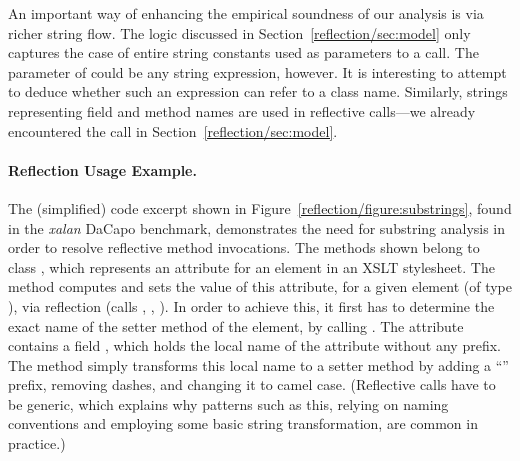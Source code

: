 An important way of enhancing the empirical soundness of our analysis
is via richer string flow. The logic discussed in
Section~\ref{reflection/sec:model} only captures the case of entire
string constants used as parameters to a  call. The
parameter of  could be any string expression,
however. It is interesting to attempt to deduce whether such an
expression can refer to a class name. Similarly, strings representing
field and method names are used in reflective calls---we already
encountered the  call in
Section~\ref{reflection/sec:model}.

\paragraph{Reflection Usage Example.}
The (simplified) code excerpt shown in Figure~\ref{reflection/figure:substrings},
found in the \emph{xalan} DaCapo benchmark, demonstrates the need for
substring analysis in order to resolve reflective method
invocations. The methods shown belong to class
,
which represents an attribute for an element in an XSLT
stylesheet. The method  computes and sets the value
of this attribute, for a given element (of type
), via reflection (calls ,
, ). In order to achieve this, it first has
to determine the exact name of the setter method of the element, by
calling . The attribute contains a field
, which holds the local name of the attribute without any
prefix. The method simply transforms this local name to a setter
method by adding a ``'' prefix, removing dashes, and changing
it to camel case. (Reflective calls have to be generic, which explains
why patterns such as this, relying on naming conventions and employing
some basic string transformation, are common in practice.)


